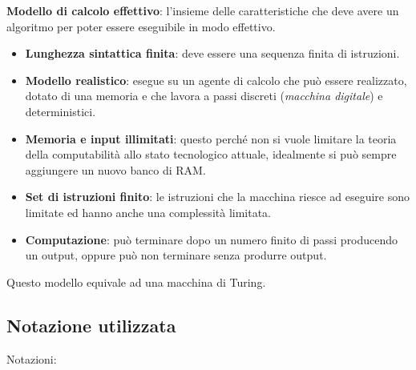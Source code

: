 \textbf{Modello di calcolo effettivo}: l'insieme delle caratteristiche che
deve avere un algoritmo per poter essere eseguibile in modo effettivo.

\begin{itemize}
\item
  \textbf{Lunghezza sintattica finita}: deve essere una sequenza finita
  di istruzioni.
\item
  \textbf{Modello realistico}: esegue su un agente di calcolo che può
  essere realizzato, dotato di una memoria e che lavora a passi discreti
  (\emph{macchina digitale}) e deterministici.
\item
  \textbf{Memoria e input illimitati}: questo perché non si vuole
  limitare la teoria della computabilità allo stato tecnologico attuale,
  idealmente si può sempre aggiungere un nuovo banco di RAM.
\item
  \textbf{Set di istruzioni finito}: le istruzioni che la macchina
  riesce ad eseguire sono limitate ed hanno anche una complessità
  limitata.
\item
  \textbf{Computazione}: può terminare dopo un numero finito di passi
  producendo un output, oppure può non terminare senza produrre output.
\end{itemize}

Questo modello equivale ad una macchina di Turing.

\subsection{Notazione utilizzata}\label{notazione-utilizzata}

Notazioni:

